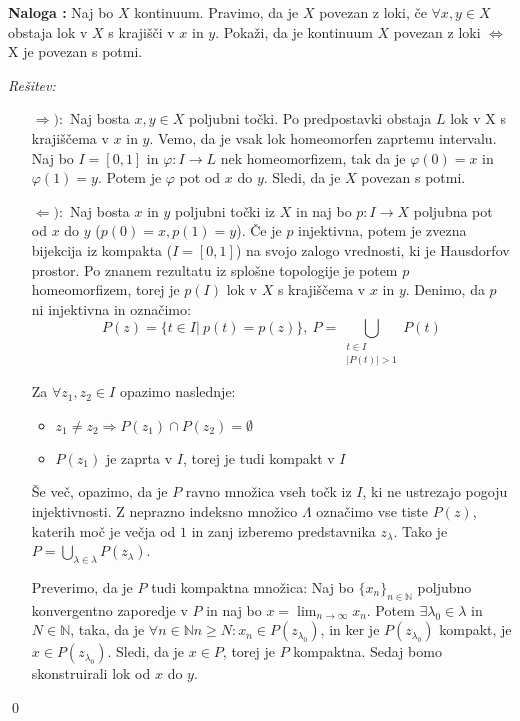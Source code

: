 \documentclass[a4paper, 10pt]{article}
\newcounter{nalogacount}
\newenvironment{naloga}{\begin{flushleft}\stepcounter{nalogacount}\textbf{Naloga \arabic{nalogacount}:}}{\hfill\end{flushleft}}
\newenvironment{Rešitev}{\begin{flushleft}\textit{Rešitev:}}{\hfill\qed\end{flushleft}}
\newcommand{\abs}[1]{\ensuremath{\lvert #1 \rvert}}
\newcommand{\mth}[1]{\ensuremath{\mathbb{#1}}}
\newcommand{\N}{\mth{N}}
\newcommand{\map}[3]{\ensuremath{{#1}: {#2} \rightarrow {#3}}}
\begin{document}
	\begin{naloga}
		Naj bo $X$ kontinuum. Pravimo, da je $X$ povezan z loki, če $\forall x, y\in X$ obstaja lok v $X$ s krajišči v $x$ in $y$. Pokaži, da je kontinuum $X$ povezan z loki $\iff$ X je povezan s potmi.
	\end{naloga}
	\begin{Rešitev}
		\begin{itemize}
			\item[$\Rightarrow):$] Naj bosta $x, y\in X$ poljubni točki. Po predpostavki obstaja $L$ lok v X s krajiščema v $x$ in $y$. Vemo, da je vsak lok homeomorfen zaprtemu intervalu. Naj bo $I = [0, 1]$ in $\map{\varphi}{I}{L}$ nek homeomorfizem, tak da je $\varphi(0) = x$ in $\varphi(1) = y$. Potem je $\varphi$ pot od $x$ do $y$. Sledi, da je $X$ povezan s potmi.
			
			\item[$\Leftarrow):$] Naj bosta $x$ in $y$ poljubni točki iz $X$ in naj bo $\map{p}{I}{X}$ poljubna pot od $x$ do $y$ ($p(0) = x, p(1) = y$). Če je $p$ injektivna, potem je zvezna bijekcija iz kompakta ($I = [0, 1]$) na svojo zalogo vrednosti, ki je Hausdorfov prostor. Po znanem rezultatu iz splošne topologije je potem $p$ homeomorfizem, torej je $p(I)$ lok v $X$ s krajiščema v $x$ in $y$. Denimo, da $p$ ni injektivna in označimo: $$P(z) = \{t\in I |~ p(t) = p(z)\},~ P = \bigcup_{\substack{t\in I \\ \abs{P(t)} > 1}} P(t)$$
			
			Za $\forall z_1, z_2 \in I$ opazimo naslednje: \begin{itemize}
				\item $z_1 \neq z_2 \Rightarrow P(z_1)\cap P(z_2) = \emptyset$
				\item $P(z_1)$ je zaprta v $I$, torej je tudi kompakt v $I$
			\end{itemize} 
			Še več, opazimo, da je $P$ ravno množica vseh točk iz $I$, ki ne ustrezajo pogoju injektivnosti. Z neprazno indeksno množico $\Lambda$ označimo vse tiste $P(z)$, katerih moč je večja od $1$ in zanj izberemo predstavnika $z_\lambda$. Tako je $P= \bigcup_{\lambda \in \lambda} P(z_\lambda)$.
			
			Preverimo, da je $P$ tudi kompaktna množica: Naj bo $\{x_n\}_{n\in\N}$ poljubno konvergentno zaporedje v $P$ in naj bo $x = \lim_{n\to\infty}x_n$. Potem $\exists \lambda_0\in \lambda$ in $N\in\N$, taka, da je $\forall n\in \N n\geq N: x_n \in P(z_{\lambda_0})$, in ker je $P(z_{\lambda_0})$ kompakt, je $x\in P(z_{\lambda_0})$. Sledi, da je $x\in P$, torej je $P$ kompaktna. Sedaj bomo skonstruirali lok od $x$ do $y$.
			

\end{itemize}
\end{Rešitev}
\end{document}
